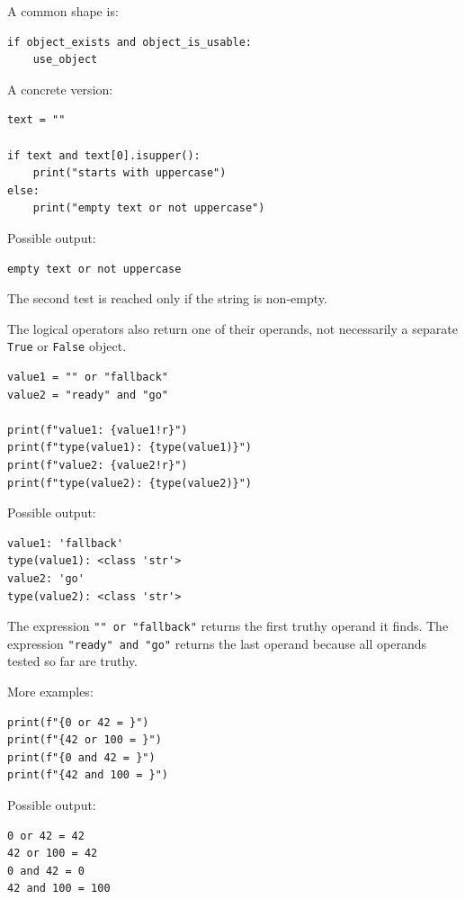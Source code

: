 A common shape is:

\begin{verbatim}
if object_exists and object_is_usable:
    use_object
\end{verbatim}

A concrete version:

\begin{verbatim}
text = ""

if text and text[0].isupper():
    print("starts with uppercase")
else:
    print("empty text or not uppercase")
\end{verbatim}

Possible output:

\begin{verbatim}
empty text or not uppercase
\end{verbatim}

The second test is reached only if the string is non-empty.

The logical operators also return one of their operands, not necessarily a separate \texttt{True} or \texttt{False} object.

\begin{verbatim}
value1 = "" or "fallback"
value2 = "ready" and "go"

print(f"value1: {value1!r}")
print(f"type(value1): {type(value1)}")
print(f"value2: {value2!r}")
print(f"type(value2): {type(value2)}")
\end{verbatim}

Possible output:

\begin{verbatim}
value1: 'fallback'
type(value1): <class 'str'>
value2: 'go'
type(value2): <class 'str'>
\end{verbatim}

The expression \texttt{"" or "fallback"} returns the first truthy operand it finds. The expression \texttt{"ready" and "go"} returns the last operand because all operands tested so far are truthy.

More examples:

\begin{verbatim}
print(f"{0 or 42 = }")
print(f"{42 or 100 = }")
print(f"{0 and 42 = }")
print(f"{42 and 100 = }")
\end{verbatim}

Possible output:

\begin{verbatim}
0 or 42 = 42
42 or 100 = 42
0 and 42 = 0
42 and 100 = 100
\end{verbatim}

